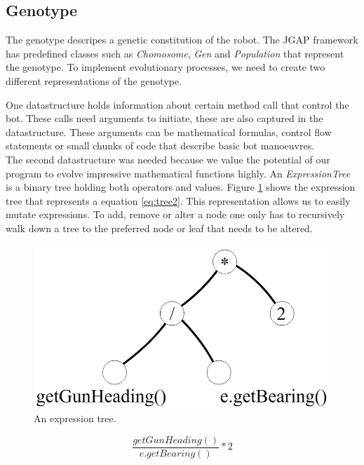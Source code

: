 \documentclass[a4paper,10pt]{article}
\begin{document}
\subsection{Genotype}
The genotype descripes a genetic constitution of the robot. The JGAP framework has predefined classes such as \textit{Chomosome}, \textit{Gen} and \textit{Population} that represent the genotype.
To implement evolutionary processes, we need to create two different representations of the genotype.

One datastructure holds information about certain method call that control the bot.
These calls need arguments to initiate, these are also captured in the datastructure. These arguments can be mathematical formulas, control flow statements or small chunks of code that describe basic bot manoeuvres.\\

The second datastructure was needed because we value the potential of our program to evolve impressive 
mathematical functions highly. An \textit{ExpressionTree} is a binary tree holding both operators and 
values. Figure \ref{fig:tree1} shows the expression tree that represents a equation \ref{eq:tree2}. 
This representation allows us to easily mutate expressions. To add, remove or alter a node 
one only has to recursively walk down a tree to the preferred node or leaf that needs to be altered.  

\begin{figure}[h!]
    \centering
    \includegraphics[scale=0.2]{tree}
    \caption{An expression tree.}
    \label{fig:tree1}
\end{figure}     
 
\begin{equation}
    \frac{getGunHeading()}{e.getBearing()}*2
    \label{eq:tree2}
\end{equation}
\end{document}
